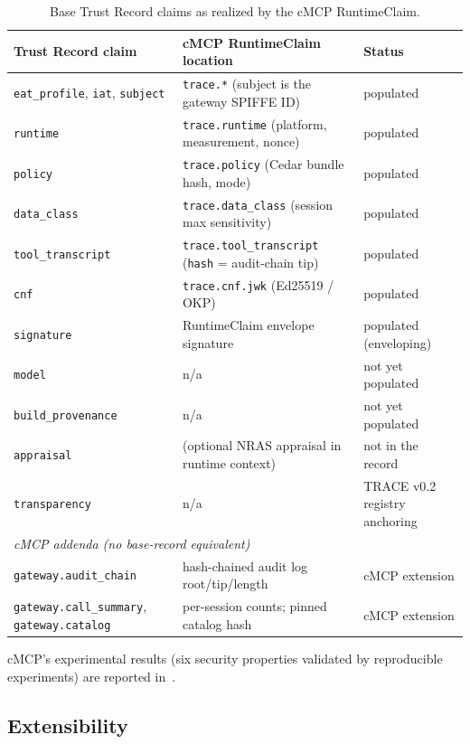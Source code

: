 \begin{table}[h]
\centering
\small
\caption{Base Trust Record claims as realized by the cMCP RuntimeClaim.}
\label{tab:cmcp-map}
\begin{tabular}{p{3.5cm}p{4.8cm}p{3.7cm}}
\toprule
Trust Record claim & cMCP RuntimeClaim location & Status \\
\midrule
\texttt{eat\_profile}, \texttt{iat}, \texttt{subject} & \texttt{trace.*} (subject is the gateway SPIFFE ID) & populated \\
\texttt{runtime} & \texttt{trace.runtime} (platform, measurement, nonce) & populated \\
\texttt{policy} & \texttt{trace.policy} (Cedar bundle hash, mode) & populated \\
\texttt{data\_class} & \texttt{trace.data\_class} (session max sensitivity) & populated \\
\texttt{tool\_transcript} & \texttt{trace.tool\_transcript} (\texttt{hash} = audit-chain tip) & populated \\
\texttt{cnf} & \texttt{trace.cnf.jwk} (Ed25519 / OKP) & populated \\
\texttt{signature} & RuntimeClaim envelope signature & populated (enveloping) \\
\texttt{model} & n/a &not yet populated \\
\texttt{build\_provenance} & n/a &not yet populated \\
\texttt{appraisal} & (optional NRAS appraisal in runtime context) & not in the record \\
\texttt{transparency} & n/a &TRACE v0.2 registry anchoring \\
\midrule
\multicolumn{3}{l}{\emph{cMCP addenda (no base-record equivalent)}} \\
\texttt{gateway.audit\_chain} & hash-chained audit log root/tip/length & cMCP extension \\
\texttt{gateway.call\_summary}, \texttt{gateway.catalog} & per-session counts; pinned catalog hash & cMCP extension \\
\bottomrule
\end{tabular}
\end{table}

cMCP's experimental results (six security properties validated by reproducible
experiments) are reported in~\citep{cmcp2026}.

\subsection{Extensibility}

